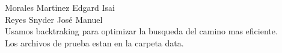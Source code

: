 \documentclass{article}
\begin{document}
Morales Martinez Edgard Isai\\
Reyes Snyder José Manuel\\
Usamos backtraking para optimizar la busqueda del camino mas eficiente.\\
Los archivos de prueba estan en la carpeta data.\\
\end{document}

